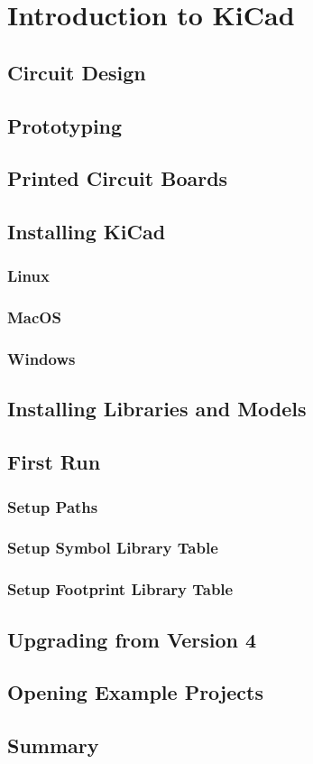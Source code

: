 
\chapter{Introduction to KiCad}
\label{ch:intro-kicad}



\section{Circuit Design}


\section{Prototyping}

\section{Printed Circuit Boards}

\section{Installing KiCad}
\subsection{Linux}
\subsection{MacOS}
\subsection{Windows}

\section{Installing Libraries and Models}

\section{First Run}
\subsection{Setup Paths}
\subsection{Setup Symbol Library Table}
\subsection{Setup Footprint Library Table}

\section{Upgrading from Version 4}

\section{Opening Example Projects}

\section{Summary}